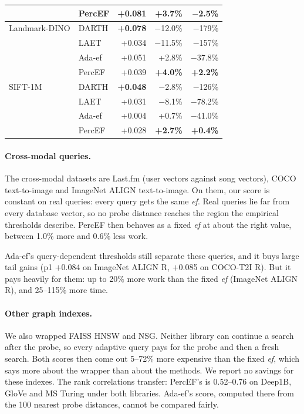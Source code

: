 \documentclass[sigconf,review=false,screen]{acmart}
\newcommand{\ef}{\textit{ef}}
\begin{document}
\begin{table}[t]
\begin{tabular}{llrrr}
                  & PercEF & +0.081 & +3.7\% & \textbf{$-$2.5\%} \\
    \midrule
    Landmark-DINO & DARTH  & \textbf{+0.078} & $-$12.0\% & $-$179\% \\
                  & LAET   & +0.034 & $-$11.5\% & $-$157\% \\
                  & Ada-ef & +0.051 & +2.8\% & $-$37.8\% \\
                  & PercEF & +0.039 & \textbf{+4.0\%} & \textbf{+2.2\%} \\
    \midrule
    SIFT-1M       & DARTH  & \textbf{+0.048} & $-$2.8\% & $-$126\% \\
                  & LAET   & +0.031 & $-$8.1\% & $-$78.2\% \\
                  & Ada-ef & +0.004 & +0.7\% & $-$41.0\% \\
                  & PercEF & +0.028 & \textbf{+2.7\%} & \textbf{+0.4\%} \\
    \bottomrule
  \end{tabular}
\end{table}

\paragraph{Cross-modal queries.}
The cross-modal datasets are Last.fm (user vectors against song vectors), COCO text-to-image and
ImageNet ALIGN text-to-image. On them, our score is constant on real queries: every query gets the
same \ef{}. Real queries lie far from every database vector, so no probe distance reaches the region
the empirical thresholds describe. PercEF then behaves as a fixed \ef{} at about the right value,
between 1.0\% more and 0.6\% less work.

Ada-ef's query-dependent thresholds still separate these queries, and it buys large tail gains (p1
$+$0.084 on ImageNet ALIGN R, $+$0.085 on COCO-T2I R). But it pays heavily for them: up to 20\% more
work than the fixed \ef{} (ImageNet ALIGN R), and 25--115\% more time.

\paragraph{Other graph indexes.}
We also wrapped FAISS HNSW and NSG. Neither library can continue a search after the probe, so every
adaptive query pays for the probe and then a fresh search. Both scores then come out 5--72\% more
expensive than the fixed \ef{}, which says more about the wrapper than about the methods. We report
no savings for these indexes. The rank correlations transfer: PercEF's is 0.52--0.76 on Deep1B, GloVe
and MS Turing under both libraries. Ada-ef's score, computed there from the 100 nearest probe
distances, cannot be compared fairly.
\end{document}
